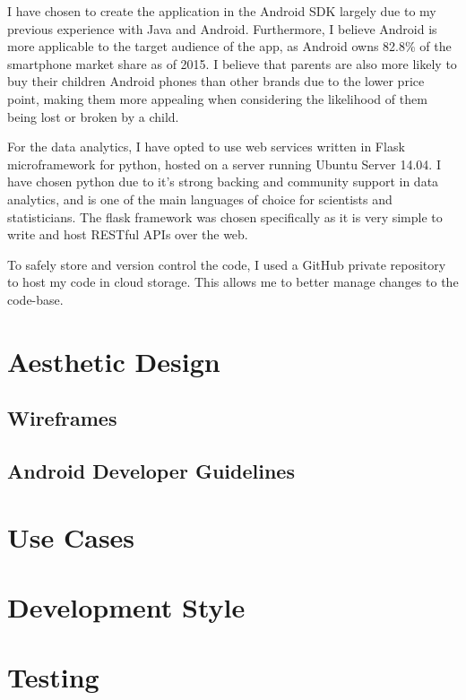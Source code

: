 I have chosen to create the application in the Android SDK largely due to my previous experience with Java and Android. 
Furthermore, I believe Android is more applicable to the target audience of the app, as Android owns 82.8\% of the smartphone market share as of 2015.
I believe that parents are also more likely to buy their children Android phones than other brands due to the lower price point, making them more appealing when considering the likelihood of them being lost or broken by a child.

For the data analytics, I have opted to use web services written in Flask microframework for python, hosted on a server running Ubuntu Server 14.04. 
I have chosen python due to it's strong backing and community support in data analytics, and is one of the main languages of choice for scientists and statisticians.
The flask framework was chosen specifically as it is very simple to write and host RESTful APIs over the web.

To safely store and version control the code, I used a GitHub private repository to host my code in cloud storage. 
This allows me to better manage changes to the code-base. 

\section{Aesthetic Design}

\subsection{Wireframes}

\subsection{Android Developer Guidelines}
\section{Use Cases}	

\section{Development Style}

\section{Testing}

